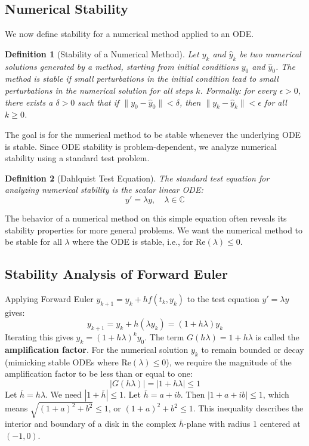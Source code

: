 \documentclass{article}
\newtheorem{definition}{Definition}
\begin{document}
\subsection{Numerical Stability}
We now define stability for a numerical method applied to an ODE.

\begin{definition}[Stability of a Numerical Method]
Let $y_k$ and $\hat{y}_k$ be two numerical solutions generated by a method, starting from initial conditions $y_0$ and $\hat{y}_0$. The method is stable if small perturbations in the initial condition lead to small perturbations in the numerical solution for all steps $k$. Formally: for every $\epsilon > 0$, there exists a $\delta > 0$ such that if $\|y_0 - \hat{y}_0\| < \delta$, then $\|y_k - \hat{y}_k\| < \epsilon$ for all $k \ge 0$.
\end{definition}

The goal is for the numerical method to be stable whenever the underlying ODE is stable. Since ODE stability is problem-dependent, we analyze numerical stability using a standard test problem.

\begin{definition}[Dahlquist Test Equation]
The standard test equation for analyzing numerical stability is the scalar linear ODE:
\[
y' = \lambda y, \quad \lambda \in \mathbb{C}
\]
\end{definition}
The behavior of a numerical method on this simple equation often reveals its stability properties for more general problems. We want the numerical method to be stable for all $\lambda$ where the ODE is stable, i.e., for $\text{Re}(\lambda) \le 0$.

\subsection{Stability Analysis of Forward Euler}
Applying Forward Euler $y_{k+1} = y_k + h f(t_k, y_k)$ to the test equation $y' = \lambda y$ gives:
\[
y_{k+1} = y_k + h (\lambda y_k) = (1 + h \lambda) y_k
\]
Iterating this gives $y_k = (1 + h \lambda)^k y_0$.
The term $G(h\lambda) = 1 + h\lambda$ is called the \textbf{amplification factor}. For the numerical solution $y_k$ to remain bounded or decay (mimicking stable ODEs where $\text{Re}(\lambda) \le 0$), we require the magnitude of the amplification factor to be less than or equal to one:
\[
|G(h\lambda)| = |1 + h\lambda| \le 1
\]
Let $\bar{h} = h\lambda$. We need $|1 + \bar{h}| \le 1$. Let $\bar{h} = a + ib$. Then $|1 + a + ib| \le 1$, which means $\sqrt{(1+a)^2 + b^2} \le 1$, or $(1+a)^2 + b^2 \le 1$.
This inequality describes the interior and boundary of a disk in the complex $\bar{h}$-plane with radius 1 centered at $(-1, 0)$.
\end{document}

